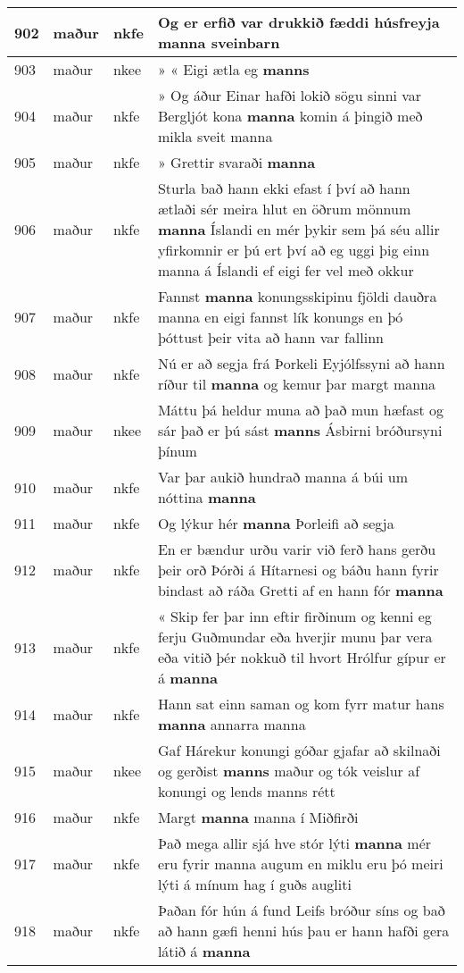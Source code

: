 \documentclass{article}
\begin{document}
\begin{longtable}{p{1cm}|p{1cm}|p{1cm}|p{13cm}}
\hline
902&maður&nkfe&Og er erfið var drukkið fæddi húsfreyja \textbf{manna} sveinbarn\\
\hline
903&maður&nkee&» « Eigi ætla eg \textbf{manns} \\
\hline
904&maður&nkfe&» Og áður Einar hafði lokið sögu sinni var Bergljót kona \textbf{manna} komin á þingið með mikla sveit manna\\
\hline
905&maður&nkfe&» Grettir svaraði \textbf{manna} \\
\hline
906&maður&nkfe&Sturla bað hann ekki efast í því að hann ætlaði sér meira hlut en öðrum mönnum \textbf{manna} Íslandi en mér þykir sem þá séu allir yfirkomnir er þú ert því að eg uggi þig einn manna á Íslandi ef eigi fer vel með okkur\\
\hline
907&maður&nkfe&Fannst \textbf{manna} konungsskipinu fjöldi dauðra manna en eigi fannst lík konungs en þó þóttust þeir vita að hann var fallinn\\
\hline
908&maður&nkfe&Nú er að segja frá Þorkeli Eyjólfssyni að hann ríður til \textbf{manna} og kemur þar margt manna\\
\hline
909&maður&nkee&Máttu þá heldur muna að það mun hæfast og sár það er þú sást \textbf{manns} Ásbirni bróðursyni þínum\\
\hline
910&maður&nkfe&Var þar aukið hundrað manna á búi um nóttina \textbf{manna} \\
\hline
911&maður&nkfe&Og lýkur hér \textbf{manna} Þorleifi að segja\\
\hline
912&maður&nkfe&En er bændur urðu varir við ferð hans gerðu þeir orð Þórði á Hítarnesi og báðu hann fyrir bindast að ráða Gretti af en hann fór \textbf{manna} \\
\hline
913&maður&nkfe&« Skip fer þar inn eftir firðinum og kenni eg ferju Guðmundar eða hverjir munu þar vera eða vitið þér nokkuð til hvort Hrólfur gípur er á \textbf{manna} \\
\hline
914&maður&nkfe&Hann sat einn saman og kom fyrr matur hans \textbf{manna} annarra manna\\
\hline
915&maður&nkee&Gaf Hárekur konungi góðar gjafar að skilnaði og gerðist \textbf{manns} maður og tók veislur af konungi og lends manns rétt\\
\hline
916&maður&nkfe&Margt \textbf{manna} manna í Miðfirði\\
\hline
917&maður&nkfe&Það mega allir sjá hve stór lýti \textbf{manna} mér eru fyrir manna augum en miklu eru þó meiri lýti á mínum hag í guðs augliti\\
\hline
918&maður&nkfe&Þaðan fór hún á fund Leifs bróður síns og bað að hann gæfi henni hús þau er hann hafði gera látið á \textbf{manna} \\

\end{longtable}
\end{document}
